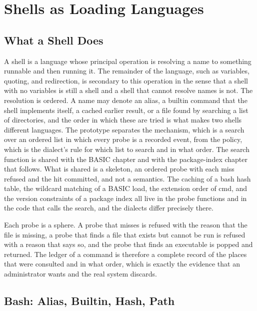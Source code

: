 \documentclass[11pt,oneside]{report}
\theoremstyle{plain}
\theoremstyle{definition}
\theoremstyle{remark}
\newcommand{\code}[2][Python]{}
\begin{document}
\chapter{Shells as Loading Languages}

\section{What a Shell Does}

A shell is a language whose principal operation is resolving a name to something runnable and then running it. The remainder of the language, such as variables, quoting, and redirection, is secondary to this operation in the sense that a shell with no variables is still a shell and a shell that cannot resolve names is not. The resolution is ordered. A name may denote an alias, a builtin command that the shell implements itself, a cached earlier result, or a file found by searching a list of directories, and the order in which these are tried is what makes two shells different languages. The prototype separates the mechanism, which is a search over an ordered list in which every probe is a recorded event, from the policy, which is the dialect's rule for which list to search and in what order. The search function is shared with the BASIC chapter and with the package-index chapter that follows. What is shared is a skeleton, an ordered probe with each miss refused and the hit committed, and not a semantics. The caching of a bash hash table, the wildcard matching of a BASIC load, the extension order of cmd, and the version constraints of a package index all live in the probe functions and in the code that calls the search, and the dialects differ precisely there.

\code{ex_shell_resolve}

Each probe is a sphere. A probe that misses is refused with the reason that the file is missing, a probe that finds a file that exists but cannot be run is refused with a reason that says so, and the probe that finds an executable is popped and returned. The ledger of a command is therefore a complete record of the places that were consulted and in what order, which is exactly the evidence that an administrator wants and the real system discards.

\section{Bash: Alias, Builtin, Hash, Path}
\end{document}
